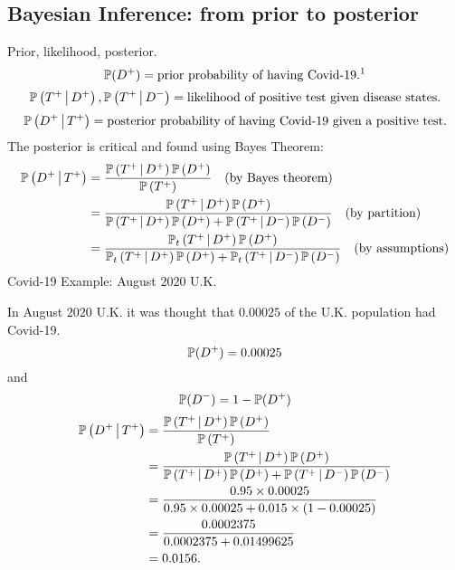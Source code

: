 \documentclass[10pt, a4paper]{article}
\begin{document}
\subsection{Bayesian Inference: from prior to posterior}
\begin{definition}
    Prior,
    likelihood,
    posterior.
    \[
    \P(D ^ {+}) = \text{prior probability of having Covid-19.\footnotemark}
    \]
    \[
    \P\left(T ^ {+} \mmid D ^ {+}\right), \P\left(T ^ {+} \mmid D ^ {-}\right) = \text{likelihood of positive test given disease states.}
    \]
    \[
    \P\left(D ^ {+} \mmid T ^ {+}\right) = \text{posterior probability of having Covid-19 given a positive test.}
    \]
    The posterior is critical and found using Bayes Theorem:
    \begin{align*}
        \P\left(D ^ {+} \mmid T ^ {+}\right) &= \frac{\P\left(T ^ {+} \mmid D ^ {+}\right)\P\left(D ^ {+}\right)}{\P\left(T ^ {+}\right)} \quad\text{(by Bayes theorem)} \\
        &= \frac{\P\left(T ^ {+} \mmid D ^ {+}\right)\P\left(D ^ {+}\right)}{\P\left(T ^ {+} \mmid D ^ {+}\right)\P\left(D ^ {+}\right) + \P\left(T ^ {+} \mmid D ^ {-}\right)\P\left(D ^ {-}\right)} \quad\text{(by partition)}\\
        &= \frac{\P_t\left(T ^ {+} \mmid D ^ {+}\right)\P\left(D ^ {+}\right)}{\P_t\left(T ^ {+} \mmid D ^ {+}\right)\P\left(D ^ {+}\right) + \P_t\left(T ^ {+} \mmid D ^ {-}\right)\P\left(D ^ {-}\right)} \quad\text{(by assumptions)} \\
    \end{align*}
    Covid-19 Example:
    August $2020$ U.K.

    In August $2020$ U.K. it was thought that $0.00025$ of the U.K. population had Covid-19.
    \[
    \P(D ^ {+}) = 0.00025
    \]
    and
    \[
    \P(D ^ {-}) = 1 - \P(D ^ {+})
    \]
    \begin{align*}
        \P\left(D ^ {+} \mmid T ^ {+}\right) &= \frac{\P\left(T ^ {+} \mmid D ^ {+}\right)\P\left(D ^ {+}\right)}{\P\left(T ^ {+}\right)} \\
        &= \frac{\P\left(T ^ {+} \mmid D ^ {+}\right)\P\left(D ^ {+}\right)}{\P\left(T ^ {+} \mmid D ^ {+}\right)\P\left(D ^ {+}\right) + \P\left(T ^ {+} \mmid D ^ {-}\right)\P\left(D ^ {-}\right)} \\
        &= \frac{0.95 \times 0.00025}{0.95 \times 0.00025 + 0.015 \times (1 - 0.00025)} \\
        &= \frac{0.0002375}{0.0002375 + 0.01499625} \\
        &= 0.0156.
    \end{align*}
\end{definition}
\end{document}
